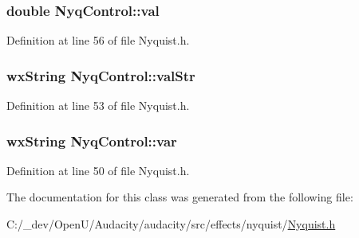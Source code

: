 \subsubsection[{\texorpdfstring{val}{val}}]{\setlength{\rightskip}{0pt plus 5cm}double Nyq\+Control\+::val}\hypertarget{class_nyq_control_adfa3e7f7d9abb87f6abdb6c5d05e1dc6}{}\label{class_nyq_control_adfa3e7f7d9abb87f6abdb6c5d05e1dc6}


Definition at line 56 of file Nyquist.\+h.

\subsubsection[{\texorpdfstring{val\+Str}{valStr}}]{\setlength{\rightskip}{0pt plus 5cm}wx\+String Nyq\+Control\+::val\+Str}\hypertarget{class_nyq_control_ab8f70b3aa4cb16336b48c1324013cd19}{}\label{class_nyq_control_ab8f70b3aa4cb16336b48c1324013cd19}


Definition at line 53 of file Nyquist.\+h.

\subsubsection[{\texorpdfstring{var}{var}}]{\setlength{\rightskip}{0pt plus 5cm}wx\+String Nyq\+Control\+::var}\hypertarget{class_nyq_control_a4d04c6ba2c0853380997e04ecb9eca92}{}\label{class_nyq_control_a4d04c6ba2c0853380997e04ecb9eca92}


Definition at line 50 of file Nyquist.\+h.



The documentation for this class was generated from the following file\+:\begin{DoxyCompactItemize}
\item 
C\+:/\+\_\+dev/\+Open\+U/\+Audacity/audacity/src/effects/nyquist/\hyperlink{_nyquist_8h}{Nyquist.\+h}\end{DoxyCompactItemize}
